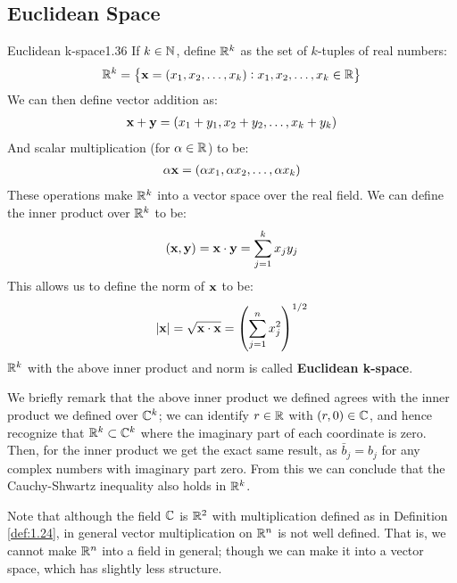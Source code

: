 \subsection{Euclidean Space}
\begin{definition}{Euclidean k-space}{1.36}
    If $k \in \mathbb{N}$, define $\mathbb{R}^k$ as the set of $k$-tuples of real numbers:
    \begin{align*}
        \mathbb{R}^k = \set{\ensuremath{\mathbf{x}} = (x_1, x_2, \ldots, x_k): x_1, x_2, \ldots, x_k \in \mathbb{R}}
    \end{align*}
    We can then define vector addition as:
    \begin{align*}
        \mathbf{x} + \mathbf{y} = (x_1 + y_1, x_2 + y_2, \ldots, x_k + y_k)
    \end{align*}
    And scalar multiplication (for $\alpha \in \mathbb{R}$) to be:
    \begin{align*}
        \alpha\mathbf{x} = (\alpha x_1, \alpha x_2, \ldots, \alpha x_k)
    \end{align*}
    These operations make $\mathbb{R}^k$ into a vector space over the real field. We can define the inner product over $\mathbb{R}^k$ to be:
    \begin{align*}
        (\mathbf{x}, \mathbf{y}) = \mathbf{x} \cdot \mathbf{y} = \sum_{j=1}^k x_jy_j
    \end{align*}
    This allows us to define the norm of $\mathbf{x}$ to be:
    \begin{align*}
        \abs{\mathbf{x}} = \sqrt{\mathbf{x} \cdot \mathbf{x}} = \left(\sum_{j=1}^n x_j^2\right)^{1/2}
    \end{align*}
    $\mathbb{R}^k$ with the above inner product and norm is called \textbf{Euclidean k-space}.
\end{definition}
\noindent We briefly remark that the above inner product we defined agrees with the inner product we defined over $\mathbb{C}^k$; we can identify $r \in \mathbb{R}$ with $(r, 0) \in \mathbb{C}$, and hence recognize that $\mathbb{R}^k \subset \mathbb{C}^k$ where the imaginary part of each coordinate is zero. Then, for the inner product we get the exact same result, as $\bar{b}_j = b_j$ for any complex numbers with imaginary part zero. From this we can conclude that the Cauchy-Shwartz inequality also holds in $\mathbb{R}^k$. 

Note that although the field $\mathbb{C}$ is $\mathbb{R}^2$ with multiplication defined as in Definition \ref{def:1.24}, in general vector multiplication on $\mathbb{R}^n$ is not well defined. That is, we cannot make $\mathbb{R}^n$ into a field in general; though we can make it into a vector space, which has slightly less structure.

